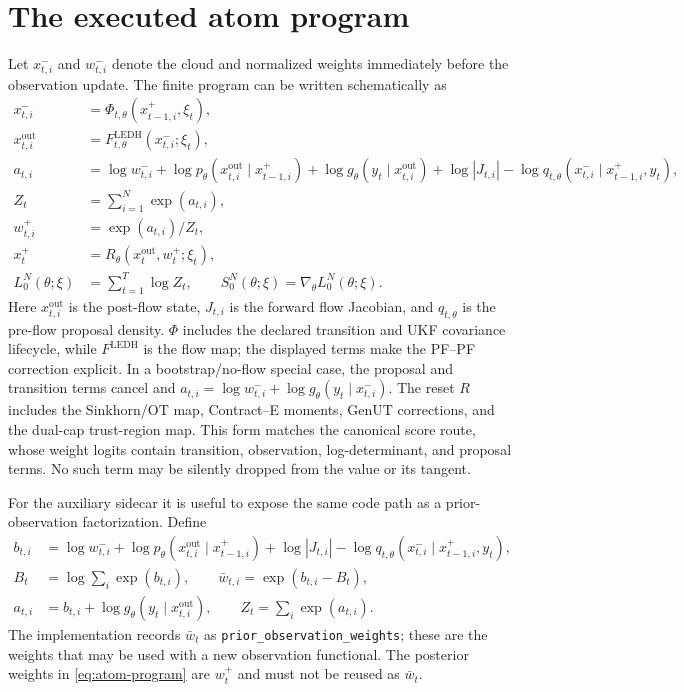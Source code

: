 \documentclass[11pt]{article}
\newcommand{\GenUT}{\ensuremath{\mathrm{GenUT}}}
\newcommand{\OT}{\ensuremath{\mathrm{OT}}}
\begin{document}
\section{The executed atom program}
\label{sec:atom}

Let $x_{t,i}^{-}$ and $w_{t,i}^{-}$ denote the cloud and normalized weights
immediately before the observation update.  The finite program can be written
schematically as
\begin{align}
 x_{t,i}^{-}
   &= \Phi_{t,\theta}(x_{t-1,i}^{+},\xi_t), \\
 x_{t,i}^{\mathrm{out}}
   &= F_{t,\theta}^{\mathrm{LEDH}}(x_{t,i}^{-};\xi_t), \\
 a_{t,i}
   &= \log w_{t,i}^{-}
      +\log p_\theta(x_{t,i}^{\mathrm{out}}\mid x_{t-1,i}^{+})
      +\log g_\theta(y_t\mid x_{t,i}^{\mathrm{out}})
      +\log |J_{t,i}|
      -\log q_{t,\theta}(x_{t,i}^{-}\mid x_{t-1,i}^{+},y_t), \\
 Z_t
   &= \sum_{i=1}^{N}\exp(a_{t,i}), \\
 w_{t,i}^{+}
   &= \exp(a_{t,i})/Z_t, \\
 x_t^{+}
   &= R_\theta(x_t^{\mathrm{out}},w_t^{+};\xi_t), \label{eq:atom-program}\\
 L_0^N(\theta;\xi)
   &= \sum_{t=1}^{T}\log Z_t,\qquad
 S_0^N(\theta;\xi)=\nabla_\theta L_0^N(\theta;\xi).
\end{align}
Here $x_{t,i}^{\mathrm{out}}$ is the post-flow state, $J_{t,i}$ is the
forward flow Jacobian, and $q_{t,\theta}$ is the pre-flow proposal density.
$\Phi$ includes the declared transition and UKF covariance lifecycle, while
$F^{\mathrm{LEDH}}$ is the flow map; the displayed terms make the PF--PF
correction explicit.  In a
bootstrap/no-flow special case, the proposal and transition terms cancel and
$a_{t,i}=\log w_{t,i}^{-}+\log g_\theta(y_t\mid x_{t,i}^{-})$.  The reset $R$
includes the Sinkhorn/\OT{} map, Contract--E moments, \GenUT{} corrections,
and the dual-cap trust-region map.  This form matches the canonical score
route, whose weight logits contain transition, observation, log-determinant,
and proposal terms.  No such term may be silently dropped from the value or
its tangent.

For the auxiliary sidecar it is useful to expose the same code path as a
prior-observation factorization.  Define
\begin{align}
 b_{t,i} &= \log w_{t,i}^{-}
      +\log p_\theta(x_{t,i}^{\mathrm{out}}\mid x_{t-1,i}^{+})
      +\log |J_{t,i}|
      -\log q_{t,\theta}(x_{t,i}^{-}\mid x_{t-1,i}^{+},y_t),\\
 B_t &= \log\sum_i\exp(b_{t,i}),\qquad
 \bar w_{t,i}=\exp(b_{t,i}-B_t),\\
 a_{t,i} &= b_{t,i}+\log g_\theta(y_t\mid x_{t,i}^{\mathrm{out}}),\qquad
 Z_t=\sum_i\exp(a_{t,i}).
 \label{eq:prior-observation-factorization}
\end{align}
The implementation records $\bar w_t$ as
\texttt{prior\_observation\_weights}; these are the weights that may be
used with a new observation functional.  The posterior weights in
\eqref{eq:atom-program} are $w_t^+$ and must not be reused as $\bar w_t$.
\end{document}
